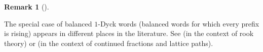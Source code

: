 \documentclass[numbers=enddot,12pt,final,onecolumn,notitlepage]{scrartcl}%
\theoremstyle{definition}
\newtheorem{prop}[theo]{Proposition}
\newenvironment{proposition}[1][]
{\begin{prop}[#1]\begin{leftbar}}
{\end{leftbar}\end{prop}}
\newtheorem{remk}[theo]{Remark}
\newenvironment{remark}[1][]
{\begin{remk}[#1]\begin{leftbar}}
{\end{leftbar}\end{remk}}
\newenvironment{proof}[1][Proof]{\noindent\textbf{#1.} }{\ \rule{0.5em}{0.5em}}
\newcommand{\M}{\mathcal{M}}
\newcommand{\SE}{\operatorname{SE}}
\newcommand{\NE}{\operatorname{NE}}
\newcommand{\balsim}{\overset{\operatorname*{bal}}{\sim}}
\newcommand{\tup}[1]{\left( #1 \right)}
\begin{document}
\begin{remark}
The special case of balanced $1$-Dyck words (balanced words for which every prefix is rising) appears in different places in the literature. See \cite[Theorem 6]{GJW75} (in the context of rook theory) or \cite[Proposition 3A and 3B]{Flajol80} (in the context of continued fractions and lattice paths).    
\end{remark}






\end{document}
